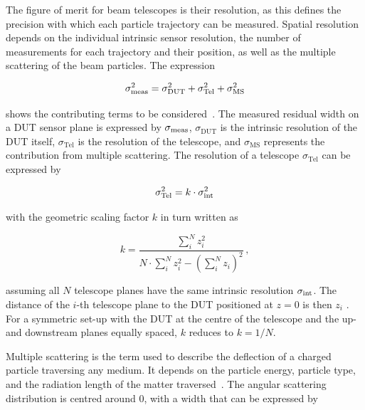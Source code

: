 The figure of merit for beam telescopes is their resolution, as this defines the precision with which each particle trajectory can be measured. 
Spatial resolution depends on the individual intrinsic sensor resolution, the number of measurements for each trajectory and their position, as well as the multiple scattering of the beam particles.
The expression

\begin{equation}
\label{eq:telescoperesolutionequation}
\sigma_{\textrm{meas}}^2 = \sigma_{\textrm{DUT}}^2 + \sigma_{\textrm{Tel}}^2 + \sigma_{\textrm{MS}}^2
\end{equation}

\noindent shows the contributing terms to be considered~\cite{ref:eudetreport200902}. 
The measured residual width on a DUT sensor plane is expressed by $\sigma_{\textrm{meas}}$, $\sigma_{\textrm{DUT}}$ is the intrinsic resolution of the DUT itself,
 $\sigma_{\textrm{Tel}}$ is the resolution of the telescope, and $\sigma_{\textrm{MS}}$ represents the contribution from multiple scattering.
The resolution of a telescope $\sigma_{\textrm{Tel}}$ can be expressed by

\begin{equation}
\label{eq:telescopepointing}
\sigma_{\textrm{Tel}}^2 = k \cdot \sigma_{\textrm{int}}^2
\end{equation}

\noindent with the geometric scaling factor $k$ in turn written as

\begin{equation}
k = \frac{\sum_i^N z_i^2}{N \cdot \sum_i^N z_i^2 - \left( \sum_i^N z_i \right)^2} \,,
\end{equation}

\noindent assuming all $N$ telescope planes have the same intrinsic resolution $\sigma_{\textrm{int}}$. 
The distance of the $i$-th telescope plane to the DUT positioned at $z=0$ is then $z_i$ .
For a symmetric set-up with the DUT at the centre of the telescope and the up- and downstream planes equally spaced, $k$ reduces to $k = 1/N$. 

Multiple scattering is the term used to describe the deflection of a charged particle traversing any medium.
It depends on the particle energy, particle type, and the radiation length of the matter traversed~\cite{ref:scatteringhighland}.
The angular scattering distribution is centred around $0$, with a width that can be expressed by~\cite{ref:PDG-2014}

